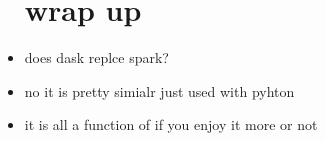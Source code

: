 \documentclass{article}
\begin{document}
\begin{itemize}
\section{wrap up}
\item does dask replce spark?
\item no it is pretty simialr just used with pyhton 
\item it is all a function of if you enjoy it more or not 
\end{itemize}
\end{document}
